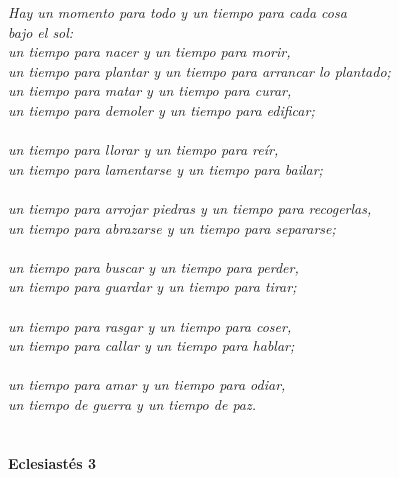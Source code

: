 %
\pagestyle{empty}

\begin{flushright}
\textit{
\footnotesize
Hay un momento para todo y un tiempo para cada cosa \\
bajo el sol:\\
un tiempo para nacer y un tiempo para morir,\\
un tiempo para plantar y un tiempo para arrancar lo plantado;\\
\newline
\newline
un tiempo para matar y un tiempo para curar,\\
un tiempo para demoler y un tiempo para edificar;\\
\\
un tiempo para llorar y un tiempo para reír,\\
un tiempo para lamentarse y un tiempo para bailar;\\
\\
un tiempo para arrojar piedras y un tiempo para recogerlas,\\
un tiempo para abrazarse y un tiempo para separarse;\\
\\
un tiempo para buscar y un tiempo para perder,\\
un tiempo para guardar y un tiempo para tirar;\\
\\
un tiempo para rasgar y un tiempo para coser,\\
un tiempo para callar y un tiempo para hablar;\\
\\
un tiempo para amar y un tiempo para odiar,\\
un tiempo de guerra y un tiempo de paz.\\
\\
\\
}
\small
\textbf{Eclesiastés 3}
\end{flushright}
\normalsize